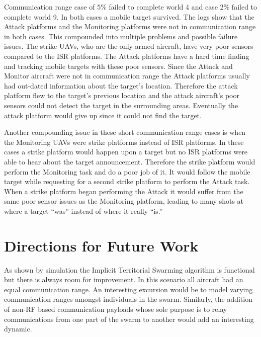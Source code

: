 \begin{multicols*}{2}
Communication range case of $5\%$ failed to complete world 4 and case $2\%$ failed to complete world 9.  In both cases a mobile target survived.  The logs show that the Attack platforms and the Monitoring platforms were not in communication range in both cases.  This compounded into multiple problems and possible failure issues.  The strike UAVs, who are the only armed aircraft, have very poor sensors compared to the ISR platforms.  The Attack platforms have a hard time finding and tracking mobile targets with these poor sensors.  Since the Attack and Monitor aircraft were not in communication range the Attack platforms usually had out-dated information about the target's location.  Therefore the attack platform flew to the target's previous location and the attack aircraft's poor sensors could not detect the target in the surrounding areas.  Eventually the attack platform would give up since it could not find the target.

Another compounding issue in these short communication range cases is when the Monitoring UAVs were strike platforms instead of ISR platforms.  In these cases a strike platform would happen upon a target but no ISR platforms were able to hear about the target announcement.  Therefore the strike platform would perform the Monitoring task and do a poor job of it.  It would follow the mobile target while requesting for a second strike platform to perform the Attack task.  When a strike platform began performing the Attack it would suffer from the same poor sensor issues as the Monitoring platform, leading to many shots at where a target ``was'' instead of where it really ``is.''


\section{Directions for Future Work}
As shown by simulation the Implicit Territorial Swarming algorithm is functional but there is always room for improvement.  In this scenario all aircraft had an equal communication range.  An interesting excursion would be to model varying communication ranges amongst individuals in the swarm.  Similarly, the addition of non-RF based communication payloads whose sole purpose is to relay communications from one part of the swarm to another would add an interesting dynamic.


\end{multicols*}
